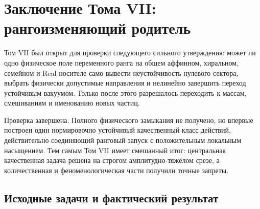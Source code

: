\chapter{Заключение Тома VII: рангоизменяющий родитель}
\label{ch:v7-final-conclusion}

Том VII был открыт для проверки следующего сильного утверждения: может ли
одно физическое поле переменного ранга на общем аффинном, хиральном,
семейном и Real-носителе само вывести неустойчивость нулевого сектора,
выбрать физически допустимые направления и нелинейно завершить переход
устойчивым вакуумом. Только после этого разрешалось переходить к массам,
смешиваниям и именованию новых частиц.

Проверка завершена. Полного физического замыкания не получено, но впервые
построен один нормировочно устойчивый качественный класс действий,
действительно соединяющий ранговый запуск с положительным локальным
насыщением. Тем самым Том VII имеет смешанный итог: центральная
качественная задача решена на строгом амплитудно-тяжёлом срезе, а
количественная и феноменологическая части получили точные запреты.

\section{Исходные задачи и фактический результат}

